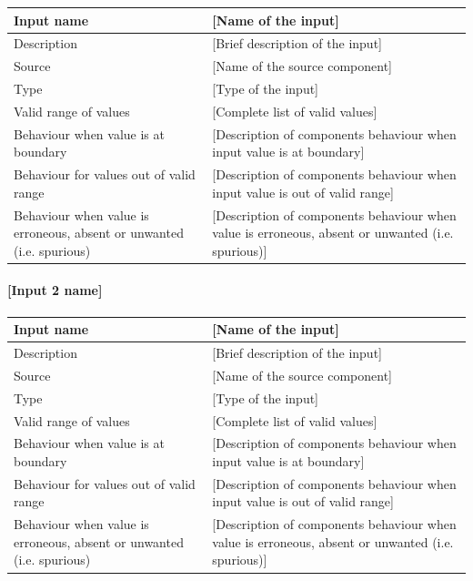 \begin{longtable}{p{}p{}}
\toprule
Input name				& [Name of the input] \\
\midrule
Description				& [Brief description of the input] \\
\midrule
Source					& [Name of the source component] \\ 
\midrule
Type					& [Type of the input] \\
\midrule
Valid range of values	& [Complete list of valid values] \\
\midrule
Behaviour when value is at boundary	& [Description of components behaviour when input value is at boundary] \\
\midrule
Behaviour for values out of valid range	& [Description of components behaviour when input value is out of valid range] \\
\midrule
Behaviour when value is erroneous, absent or unwanted (i.e. spurious) & [Description of components behaviour when value is erroneous, absent or unwanted (i.e. spurious)] \\
\bottomrule
\end{longtable}


\paragraph{[Input 2 name]}

\begin{longtable}{p{}p{}}
\toprule
Input name				& [Name of the input] \\
\midrule
Description				& [Brief description of the input] \\
\midrule
Source					& [Name of the source component] \\ 
\midrule
Type					& [Type of the input] \\
\midrule
Valid range of values	& [Complete list of valid values] \\
\midrule
Behaviour when value is at boundary	& [Description of components behaviour when input value is at boundary] \\
\midrule
Behaviour for values out of valid range	& [Description of components behaviour when input value is out of valid range] \\
\midrule
Behaviour when value is erroneous, absent or unwanted (i.e. spurious) & [Description of components behaviour when value is erroneous, absent or unwanted (i.e. spurious)] \\
\bottomrule
\end{longtable}


